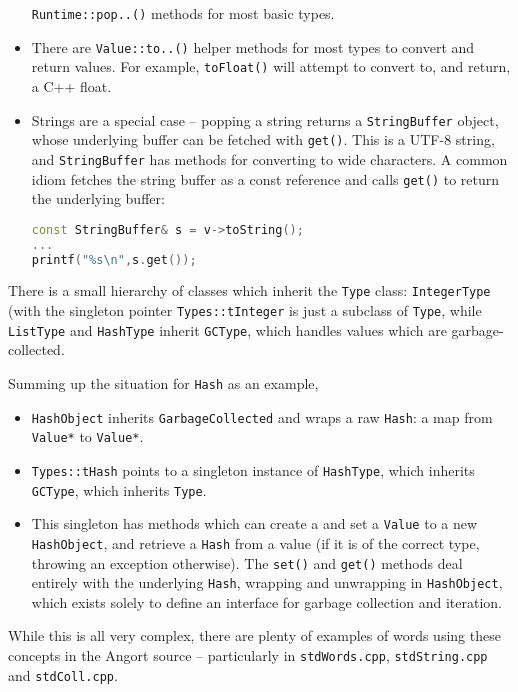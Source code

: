 \begin{itemize}
\texttt{Runtime::pop..()} methods for most basic types.
\item There are \texttt{Value::to..()} helper methods for most
types to convert and return values. For example, \texttt{toFloat()} will
attempt to convert to, and return, a C++ float.
\item Strings are a special case -- popping a string returns a
\texttt{StringBuffer} object, whose underlying buffer can be fetched
with \texttt{get()}. This is a UTF-8 string, and \texttt{StringBuffer} 
has methods for converting to wide characters. A common idiom fetches
the string buffer as a const reference and calls \texttt{get()} to
return the underlying buffer:
\begin{lstlisting}[language=c++]
const StringBuffer& s = v->toString();
...
printf("%s\n",s.get());
\end{lstlisting}
\end{itemize}

There is a small hierarchy of classes which inherit the \texttt{Type} class:
\texttt{IntegerType} (with the singleton pointer \texttt{Types::tInteger} is
just a subclass of \texttt{Type}, while \texttt{ListType} and
\texttt{HashType} inherit \texttt{GCType}, which handles values which
are garbage-collected.

Summing up the situation for \texttt{Hash} as an example,
\begin{itemize}
\item \texttt{HashObject} inherits \texttt{GarbageCollected} and
wraps a raw \texttt{Hash}: a map from \texttt{Value*} to
\texttt{Value*}.
\item \texttt{Types::tHash} points to a singleton instance of
\texttt{HashType}, which inherits \texttt{GCType}, which inherits
\texttt{Type}.
\item This singleton has methods which can create a and
set a \texttt{Value} to a new \texttt{HashObject},
and retrieve a \texttt{Hash} from a value (if it is of the correct type, throwing
an exception otherwise). The \texttt{set()} and \texttt{get()} methods
deal entirely with the underlying \texttt{Hash}, wrapping and unwrapping
in \texttt{HashObject}, which exists solely to define an
interface for garbage collection and iteration.
\end{itemize}
While this is all very complex, there are plenty of examples of words
using these concepts in the Angort source --
particularly in \texttt{stdWords.cpp}, \texttt{stdString.cpp} and
\texttt{stdColl.cpp}.




